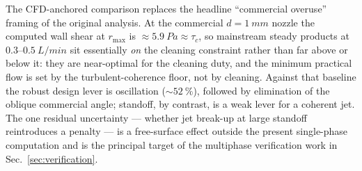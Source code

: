 \documentclass[aps,prfluids,reprint,amsmath,amssymb,floatfix]{revtex4-2}
\begin{document}
\begin{table}[h]
\centering
\caption{Theoretical optima vs.\ commercial bidet specifications.
Supply pressure $\Delta P = \SI{0.07}{MPa}$; flow rates are physical
(discharge coefficient $C_d$ included).}
\label{tab:commercial}
\end{table}

The CFD-anchored comparison replaces the headline ``commercial overuse''
framing of the original analysis. At the commercial $d = \SI{1}{mm}$ nozzle
the computed wall shear at $r_\mathrm{max}$ is $\approx \SI{5.9}{Pa}
\approx \tau_c$, so mainstream steady products at $0.3$--$\SI{0.5}{L/min}$ sit
essentially \emph{on} the cleaning constraint rather than far above or below
it: they are near-optimal for the cleaning duty, and the minimum practical
flow is set by the turbulent-coherence floor, not by cleaning. Against that
baseline the robust design lever is oscillation ($\sim\SI{52}{\percent}$),
followed by elimination of the oblique commercial angle; standoff, by
contrast, is a weak lever for a coherent jet. The one residual uncertainty ---
whether jet break-up at large standoff reintroduces a penalty --- is a
free-surface effect outside the present single-phase computation and is the
principal target of the multiphase verification work in
Sec.~\ref{sec:verification}.
\end{document}
